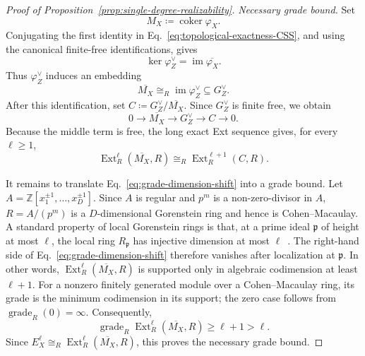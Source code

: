 \documentclass[aps,prx,english,superscriptaddress,twocolumn,tightenlines,showpacs,longbibliography,floatfix,amsfonts]{revtex4-2}
\theoremstyle{remark}
\theoremstyle{definition}
\begin{document}
\begin{proof}[Proof of Proposition~\ref{prop:single-degree-realizability}]
	\emph{Necessary grade bound.}
	Set
	\begin{equation}
		M_X\coloneqq\operatorname{coker}\varphi_X.
	\end{equation}
	Conjugating the first identity in
	Eq.~\eqref{eq:topological-exactness-CSS}, and using the canonical
	finite-free identifications, gives
	\begin{equation}
		\ker\varphi_Z^\vee
		=
		\operatorname{im}\overline{\varphi_X}.
	\end{equation}
	Thus \(\varphi_Z^\vee\) induces an embedding
	\begin{equation}
		\overline{M_X}
		\cong_R
		\operatorname{im}\varphi_Z^\vee
		\subseteq G_Z^\vee.
	\end{equation}
	After this identification, set
	\(C\coloneqq G_Z^\vee/\overline{M_X}\). Since
	\(G_Z^\vee\) is finite free, we obtain
	\begin{equation}
		0\longrightarrow \overline{M_X}
		\longrightarrow G_Z^\vee\longrightarrow C
		\longrightarrow0.
		\label{eq:torsionless-embedding}
	\end{equation}
	Because the middle term is free, the long exact Ext sequence gives, for
	every \(\ell\geq1\),
	\begin{equation}
		\operatorname{Ext}_R^\ell(\overline{M_X},R)
		\cong_R
		\operatorname{Ext}_R^{\ell+1}(C,R).
		\label{eq:grade-dimension-shift}
	\end{equation}

	It remains to translate Eq.~\eqref{eq:grade-dimension-shift} into a grade
	bound. Let
	\(A=\mathbb Z[x_1^{\pm1},\ldots,x_D^{\pm1}]\). Since \(A\) is regular
	and \(p^m\) is a non-zero-divisor in \(A\),
	\(R=A/(p^m)\) is a \(D\)-dimensional Gorenstein ring and hence is
	Cohen--Macaulay. A standard property of local Gorenstein rings is that,
	at a prime ideal \(\mathfrak p\) of height at most \(\ell\), the local
	ring \(R_{\mathfrak p}\) has injective dimension at most
	\(\ell\)~\cite[Thm.~21.8 and Cor.~21.17]{eisenbud1995commutative}. The right-hand side of
		Eq.~\eqref{eq:grade-dimension-shift} therefore vanishes after localization
		at \(\mathfrak p\). In other words,
		\(\operatorname{Ext}_R^\ell(\overline{M_X},R)\) is supported only in algebraic
		codimension at least \(\ell+1\). For a nonzero finitely generated module
	over a Cohen--Macaulay ring, its grade is the minimum codimension in its
	support; the zero case follows from \(\operatorname{grade}_R(0)=\infty\).
	Consequently,
	\begin{equation}
		\operatorname{grade}_R
		\operatorname{Ext}_R^\ell(\overline{M_X},R)
		\geq \ell+1>\ell.
	\end{equation}
	Since \(E_X^\ell\cong_R\operatorname{Ext}_R^\ell(\overline{M_X},R)\), this
	proves the necessary grade bound.


\end{proof}
\end{document}

